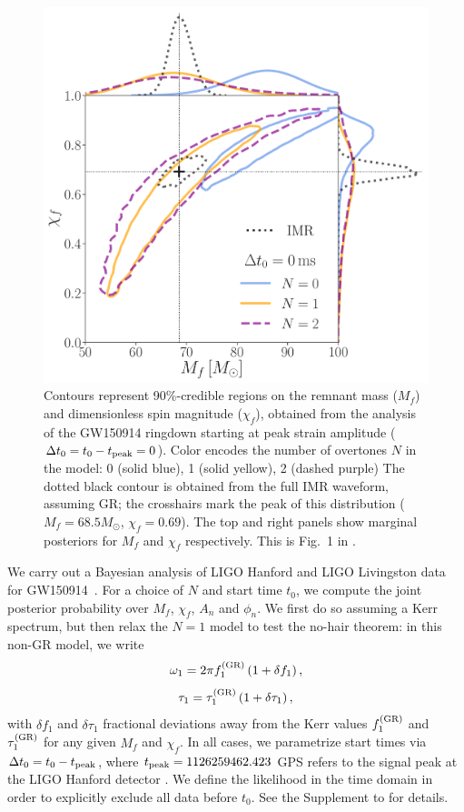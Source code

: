 \documentclass[letterpaper]{article}
\newcommand{\beq}{\begin{equation}}
\newcommand{\eeq}{\end{equation}}
\newcommand{\mf}{M_f}
\newcommand{\chif}{\chi_f}
\newcommand{\tevent}{1126259462.423}
\newcommand{\tpeak}{t_{\rm peak}}
\begin{document}
\begin{figure}[bt]
\centering
\includegraphics[width=0.66\columnwidth,clip=true]{contours_gw150914_n}
\caption{
    Contours represent 90\%-credible regions on the remnant mass ($\mf$) and dimensionless spin magnitude ($\chi_f$), obtained from the analysis of the  GW150914 ringdown starting at peak strain amplitude ($\Delta t_0 = t_0 - \tpeak = 0$).
    Color encodes the number of overtones $N$ in the model: 0 (solid blue), 1 (solid yellow), 2 (dashed purple)
    The dotted black contour is obtained from the full IMR waveform, assuming GR; the crosshairs mark the peak of this distribution ($\mf = 68.5 M_\odot$, $\chi_f=0.69$).
    The top and right panels show marginal posteriors for $\mf$ and $\chif$ respectively.
    This is Fig.~1 in \cite{Isi:2019aib}.
}
\label{fig:contours_n}
\end{figure}

We carry out a Bayesian analysis of LIGO Hanford and LIGO Livingston data for GW150914~\cite{gw150914,gwtc1:2018,gwosc}.
For a choice of $N$ and start time $t_0$, we compute the joint posterior probability over $\mf$, $\chi_f$, $A_n$ and $\phi_n$.
We first do so assuming a Kerr spectrum, but then relax the $N=1$ model to test the no-hair theorem: in this non-GR model, we write 
\beq
\omega_1=2\pi f^{\rm (GR)}_1\left(1+\delta f_1\right),
\eeq
\beq
\tau_1 = \tau^{\rm (GR)}_1\left(1+\delta\tau_1\right),
\eeq
with $\delta f_1$ and $\delta\tau_1$ fractional deviations away from the Kerr values $f^{\rm (GR)}_1$ and $\tau^{\rm (GR)}_1$ for any given $\mf$ and $\chif$.
In all cases, we parametrize start times via $\Delta t_0 = t_0 - \tpeak$, where $\tpeak = \tevent$ GPS refers to the signal peak at the LIGO Hanford detector \cite{gw150914_pe,gw150914_tgr}.
We define the likelihood in the time domain in order to explicitly exclude all data before $t_0$.
See the Supplement to \cite{Isi:2019aib} for details.
\end{document}

